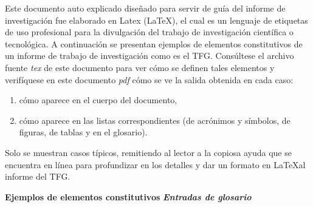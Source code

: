 Este documento auto explicado diseñado para servir de guía del informe de investigación fue elaborado en Latex (\LaTeX), el cual es un lenguaje de etiquetas de uso profesional para la divulgación del trabajo de investigación científica o tecnológica. A continuación se presentan ejemplos de elementos constitutivos de un informe de trabajo de investigación como es el TFG. Consúltese el archivo fuente \textit{tex} de este documento para ver cómo se definen tales elementos y verifíquese en este documento \textit{pdf} cómo se ve la salida obtenida en cada caso:
\begin{enumerate}
\item cómo aparece en el cuerpo del documento,
\item cómo aparece en las listas correspondientes (de acrónimos y símbolos, de figuras, de tablas y en el glosario).
\end{enumerate}
Solo se muestran casos típicos, remitiendo al lector a la copiosa ayuda que se encuentra en línea para profundizar en los detalles y dar un formato en \LaTeX\space al informe del TFG.

\textbf{Ejemplos de elementos constitutivos}
\textit{\textbf{Entradas de glosario}}

